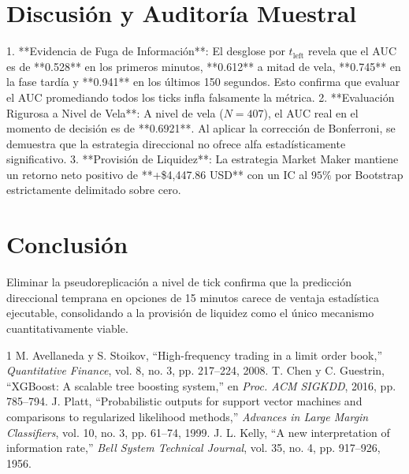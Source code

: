 \documentclass[10pt,twocolumn]{article}
\begin{document}
\section{Discusión y Auditoría Muestral}
1. **Evidencia de Fuga de Información**: El desglose por $t_{\text{left}}$ revela que el AUC es de **0.528** en los primeros minutos, **0.612** a mitad de vela, **0.745** en la fase tardía y **0.941** en los últimos 150 segundos. Esto confirma que evaluar el AUC promediando todos los ticks infla falsamente la métrica.
2. **Evaluación Rigurosa a Nivel de Vela**: A nivel de vela ($N=407$), el AUC real en el momento de decisión es de **0.6921**. Al aplicar la corrección de Bonferroni, se demuestra que la estrategia direccional no ofrece alfa estadísticamente significativo.
3. **Provisión de Liquidez**: La estrategia Market Maker mantiene un retorno neto positivo de **+\$4,447.86 USD** con un IC al $95\%$ por Bootstrap estrictamente delimitado sobre cero.

\section{Conclusión}
Eliminar la pseudoreplicación a nivel de tick confirma que la predicción direccional temprana en opciones de 15 minutos carece de ventaja estadística ejecutable, consolidando a la provisión de liquidez como el único mecanismo cuantitativamente viable.

\begin{thebibliography}{1}
 M. Avellaneda y S. Stoikov, ``High-frequency trading in a limit order book,'' \emph{Quantitative Finance}, vol. 8, no. 3, pp. 217--224, 2008.
 T. Chen y C. Guestrin, ``XGBoost: A scalable tree boosting system,'' en \emph{Proc. ACM SIGKDD}, 2016, pp. 785--794.
 J. Platt, ``Probabilistic outputs for support vector machines and comparisons to regularized likelihood methods,'' \emph{Advances in Large Margin Classifiers}, vol. 10, no. 3, pp. 61--74, 1999.
 J. L. Kelly, ``A new interpretation of information rate,'' \emph{Bell System Technical Journal}, vol. 35, no. 4, pp. 917--926, 1956.
\end{thebibliography}
\end{document}
